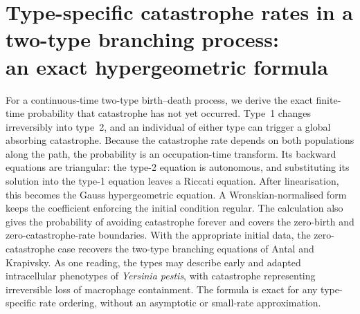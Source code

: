 \chapter[Type-specific catastrophe rates]{Type-specific catastrophe rates in a two-type branching process:\\
an exact hypergeometric formula}
\label{tt:ch:two-type}

\begin{chapterabstract}
\noindent
For a continuous-time two-type birth--death process, we derive the exact finite-time probability that catastrophe has not yet occurred. Type~1 changes irreversibly into type~2, and an individual of either type can trigger a global absorbing catastrophe. Because the catastrophe rate depends on both populations along the path, the probability is an occupation-time transform. Its backward equations are triangular: the type-2 equation is autonomous, and substituting its solution into the type-1 equation leaves a Riccati equation. After linearisation, this becomes the Gauss hypergeometric equation. A Wronskian-normalised form keeps the coefficient enforcing the initial condition regular. The calculation also gives the probability of avoiding catastrophe forever and covers the zero-birth and zero-catastrophe-rate boundaries. With the appropriate initial data, the zero-catastrophe case recovers the two-type branching equations of Antal and Krapivsky. As one reading, the types may describe early and adapted intracellular phenotypes of \textit{Yersinia pestis}, with catastrophe representing irreversible loss of macrophage containment. The formula is exact for any type-specific rate ordering, without an asymptotic or small-rate approximation.
\end{chapterabstract}








